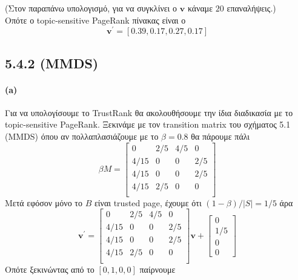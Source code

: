 \documentclass[a4paper,11pt]{article}
\begin{document}
(Στον παραπάνω υπολογισμό, για να συγκλίνει ο $\textbf{v}$ κάναμε $20$ επαναλήψεις.)
\\[8pt]
Οπότε ο topic-sensitive PageRank πίνακας είναι ο
\[ \textbf{v}^\prime = [0.39,0.17,0.27,0.17] \]

\subsection*{5.4.2 (MMDS)}

\paragraph{(a)} Για να υπολογίσουμε το TrustRank θα ακολουθήσουμε την ίδια διαδικασία με το topic-sensitive PageRank.
Ξεκινάμε με τον transition matrix του σχήματος 5.1 (MMDS) όπου αν πολλαπλασιάζουμε με το $\beta=0.8$ θα πάρουμε πάλι
\[
	\beta M =
	\begin{bmatrix}
		0 & 2/5 & 4/5 & 0 \\
		4/15 & 0 & 0 & 2/5 \\
		4/15 & 0 & 0 & 2/5 \\
		4/15 & 2/5 & 0 & 0 \\
	\end{bmatrix}
\]
Μετά εφόσον μόνο το $B$ είναι trusted page, έχουμε ότι $(1-\beta)/|S|=1/5$ άρα
\[
	\textbf{v}^\prime =
	\begin{bmatrix}
		0 & 2/5 & 4/5 & 0 \\
		4/15 & 0 & 0 & 2/5 \\
		4/15 & 0 & 0 & 2/5 \\
		4/15 & 2/5 & 0 & 0 \\
	\end{bmatrix}
	\textbf{v} +
	\begin{bmatrix}
		0 \\ 1/5 \\ 0 \\ 0
	\end{bmatrix}
\]
Οπότε ξεκινώντας από το $[0,1,0,0]$ παίρνουμε
\end{document}
